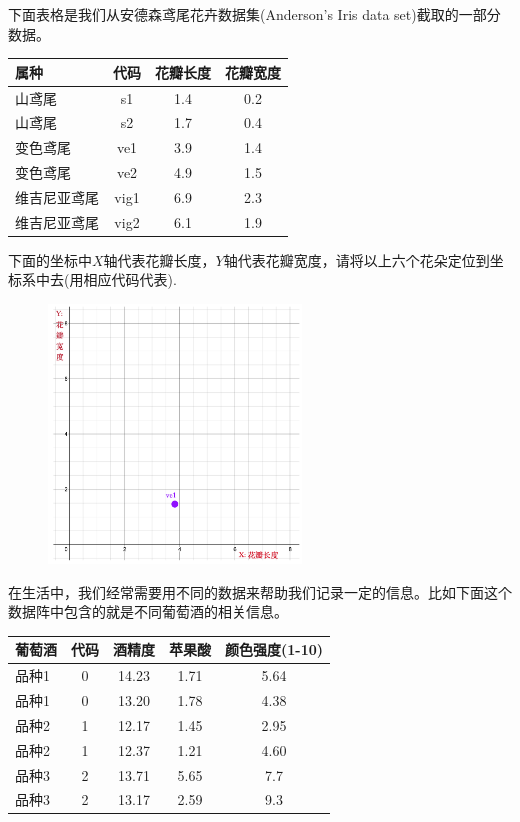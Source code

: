 \documentclass[12pt]{article}
\numberwithin{figure}{section}
\numberwithin{equation}{section}
\newenvironment{question}[2][Question]{\begin{trivlist}
\item[\hskip \labelsep {\bfseries #1}\hskip \labelsep {\bfseries #2.}]}{\end{trivlist}}
\begin{document}
\begin{question}{C1-Q2}
	下面表格是我们从安德森鸢尾花卉数据集(Anderson's Iris data set)截取的一部分数据。
	\begin{table}[H]
		\centering
		\begin{tabular}{lccc}
		\hline 
			属种 & 代码 &花瓣长度 & 花瓣宽度 \\
			\hline 
			山鸢尾 & s1 & 1.4 & 0.2 \\
			山鸢尾 & s2 & 1.7 & 0.4 \\
			变色鸢尾 & ve1 & 3.9  & 1.4 \\
			变色鸢尾 & ve2& 4.9 & 1.5 \\
			维吉尼亚鸢尾 & vig1 & 6.9 & 2.3  \\
			维吉尼亚鸢尾 & vig2 & 6.1 & 1.9 \\
			\hline  
		\end{tabular}
	\end{table}
	下面的坐标中$X$轴代表花瓣长度，$Y$轴代表花瓣宽度，请将以上六个花朵定位到坐标系中去(用相应代码代表).
	\begin{figure}[H]
		\centering
		\includegraphics[width=0.6\textwidth]{fig/C2C1coord}
	\end{figure}
\end{question}

\begin{question}{C1-Q3}
	在生活中，我们经常需要用不同的数据来帮助我们记录一定的信息。比如下面这个数据阵中包含的就是不同葡萄酒的相关信息。
		\begin{table}[H]
		\centering
		\begin{tabular}{lcccc}
		\hline 
			葡萄酒 & 代码 &酒精度 & 苹果酸 & 颜色强度(1-10) \\
			\hline 
			品种1 & 0 & 14.23 & 1.71 & 5.64 \\
			品种1 & 0 & 13.20 & 1.78 & 4.38  \\
			品种2 & 1 & 12.17  & 1.45 & 2.95 \\
			品种2 & 1& 12.37 & 1.21 & 4.60  \\
			品种3 & 2 & 13.71 & 5.65 & 7.7   \\
			品种3 & 2 & 13.17 & 2.59 & 9.3 \\
			\hline  
		\end{tabular}
	\end{table}
\end{question}
\end{document}

